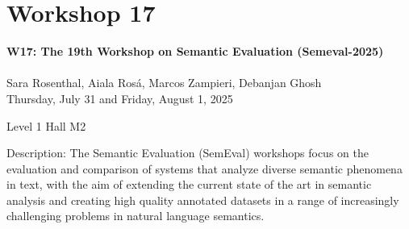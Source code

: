 \clearpage



\section[W17: The 19th Workshop on Semantic Evaluation (Semeval-2025)]{Workshop 17}
\label{workshop_17_1}
\label{workshop_17_2}

\begin{center}
    {\Large \textbf{W17: The 19th Workshop on Semantic Evaluation (Semeval-2025)}}\\
\\

   Sara Rosenthal, Aiala Rosá, Marcos Zampieri, Debanjan Ghosh\\
    
    Thursday, July 31 and Friday, August 1, 2025
    
    Level 1 Hall M2

\end{center}

Description: The Semantic Evaluation (SemEval) workshops focus on the evaluation and comparison of systems that
analyze diverse semantic phenomena in text, with the aim of extending the current state of the art in
semantic analysis and creating high quality annotated datasets in a range of increasingly challenging
problems in natural language semantics.

